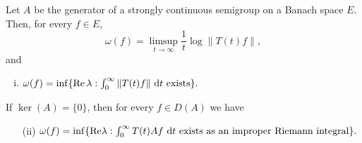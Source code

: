 \begin{theorem}\label{thm:a4-1.3}
Let $A$ be the generator of a strongly continuous semigroup on a Banach space $E$. 
Then, for every $f \in E$,
\begin{equation}\label{eq:a4-1.2}
\omega(f) = \limsup_{t \to \infty} \frac{1}{t}\log\|T(t)f\|,
\end{equation}
and
\begin{enumerate}[(i)]
\item $\omega(f) = \inf\{\mathop{}\!\mathrm{Re}\,\lambda : \int_{0}^{\infty} \|T(t)f\| \,\mathop{}\!\mathrm{d}{t} \text{ exists}\}.$
\end{enumerate}
If $\ker(A) = \{0\}$, then for every $f \in D(A)$ we have 
\begin{enumerate}
\item[(ii)] $\omega(f) = \inf\{\mathop{}\!\mathrm{Re}\lambda : \int_{0}^{\infty} T(t)Af \,\mathop{}\!\mathrm{d}{t} \text{ exists as an improper Riemann integral}\}.$
\end{enumerate}
\end{theorem}
